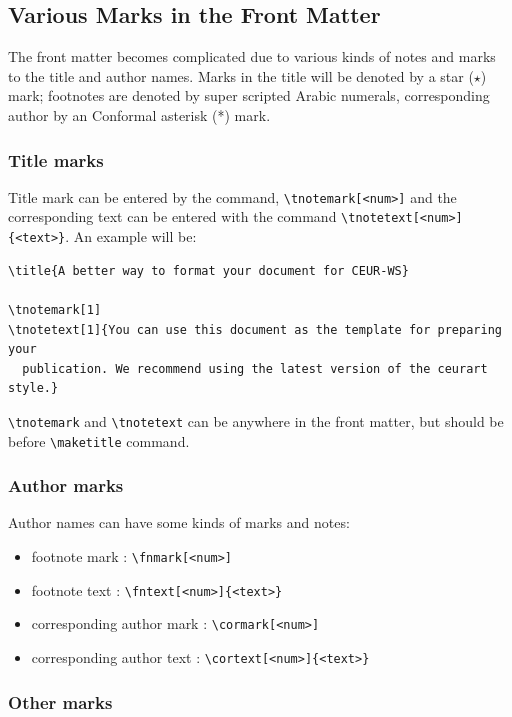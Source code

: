 \documentclass[
]{ceurart}
\begin{document}
\subsection{Various Marks in the Front Matter}

The front matter becomes complicated due to various kinds
of notes and marks to the title and author names. Marks in
the title will be denoted by a star ($\star$) mark;
footnotes are denoted by super scripted Arabic numerals,
corresponding author by an Conformal asterisk (*) mark.

\subsubsection{Title marks}

Title mark can be entered by the command, \verb|\tnotemark[<num>]|
and the corresponding text can be entered with the command
\verb|\tnotetext[<num>]{<text>}|. An example will be:

\begin{lstlisting}
\title{A better way to format your document for CEUR-WS}

\tnotemark[1]
\tnotetext[1]{You can use this document as the template for preparing your
  publication. We recommend using the latest version of the ceurart style.}
\end{lstlisting}

\verb|\tnotemark| and \verb|\tnotetext| can be anywhere in
the front matter, but should be before \verb|\maketitle| command.

\subsubsection{Author marks}

Author names can have some kinds of marks and notes:
\begin{itemize}
\item footnote mark : \verb|\fnmark[<num>]|
\item footnote text : \verb|\fntext[<num>]{<text>}|
\item corresponding author mark : \verb|\cormark[<num>]|
\item corresponding author text : \verb|\cortext[<num>]{<text>}|
\end{itemize}

\subsubsection{Other marks}
\end{document}
